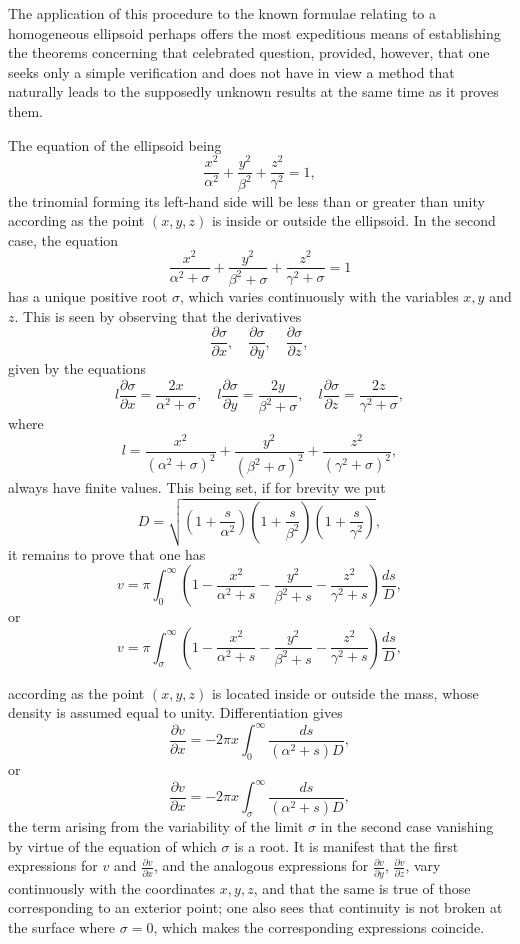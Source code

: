 \documentclass[11pt]{article}
\begin{document}
The application of this procedure to the known formulae relating to a homogeneous ellipsoid perhaps offers the most expeditious means of establishing the theorems concerning that celebrated question, provided, however, that one seeks only a simple verification and does not have in view a method that naturally leads to the supposedly unknown results at the same time as it proves them.

The equation of the ellipsoid being
\[
\frac{x^2}{\alpha^2}+\frac{y^2}{\beta^2}+\frac{z^2}{\gamma^2}=1,
\]
the trinomial forming its left-hand side will be less than or greater than unity according as the point $(x,y,z)$ is inside or outside the ellipsoid. In the second case, the equation
\[
\frac{x^2}{\alpha^2+\sigma}+\frac{y^2}{\beta^2+\sigma}+\frac{z^2}{\gamma^2+\sigma}=1
\]
has a unique positive root $\sigma$, which varies continuously with the variables $x,y$ and $z$. This is seen by observing that the derivatives
\[
\frac{\partial\sigma}{\partial x},\quad \frac{\partial\sigma}{\partial y},\quad \frac{\partial\sigma}{\partial z},
\]
given by the equations
\begin{equation}\tag{b}
 l\frac{\partial\sigma}{\partial x}=\frac{2x}{\alpha^2+\sigma},\quad
 l\frac{\partial\sigma}{\partial y}=\frac{2y}{\beta^2+\sigma},\quad
 l\frac{\partial\sigma}{\partial z}=\frac{2z}{\gamma^2+\sigma},
\end{equation}
where
\[
 l=\frac{x^2}{(\alpha^2+\sigma)^2}+\frac{y^2}{(\beta^2+\sigma)^2}+\frac{z^2}{(\gamma^2+\sigma)^2},
\]
always have finite values. This being set, if for brevity we put
\[
D=\sqrt{\left(1+\frac{s}{\alpha^2}\right)\left(1+\frac{s}{\beta^2}\right)\left(1+\frac{s}{\gamma^2}\right)},
\]
it remains to prove that one has
\[
 v=\pi\int_0^\infty\left(1-\frac{x^2}{\alpha^2+s}-\frac{y^2}{\beta^2+s}-\frac{z^2}{\gamma^2+s}\right)\frac{ds}{D},
\]
or
\[
 v=\pi\int_\sigma^\infty\left(1-\frac{x^2}{\alpha^2+s}-\frac{y^2}{\beta^2+s}-\frac{z^2}{\gamma^2+s}\right)\frac{ds}{D},
\]

according as the point $(x,y,z)$ is located inside or outside the mass, whose density is assumed equal to unity. Differentiation gives
\[
\frac{\partial v}{\partial x}=-2\pi x\int_0^\infty\frac{ds}{(\alpha^2+s)D},
\]
or
\[
\frac{\partial v}{\partial x}=-2\pi x\int_\sigma^\infty\frac{ds}{(\alpha^2+s)D},
\]
the term arising from the variability of the limit $\sigma$ in the second case vanishing by virtue of the equation of which $\sigma$ is a root. It is manifest that the first expressions for $v$ and $\frac{\partial v}{\partial x}$, and the analogous expressions for $\frac{\partial v}{\partial y}$, $\frac{\partial v}{\partial z}$, vary continuously with the coordinates $x,y,z$, and that the same is true of those corresponding to an exterior point; one also sees that continuity is not broken at the surface where $\sigma=0$, which makes the corresponding expressions coincide.
\end{document}
